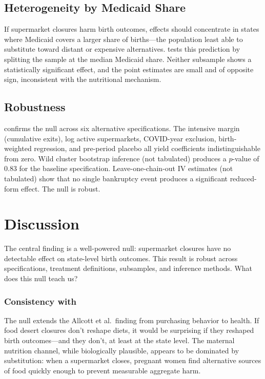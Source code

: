 \documentclass[12pt]{article}
\begin{document}


\subsection{Heterogeneity by Medicaid Share}

If supermarket closures harm birth outcomes, effects should concentrate in states where Medicaid covers a larger share of births---the population least able to substitute toward distant or expensive alternatives.  tests this prediction by splitting the sample at the median Medicaid share. Neither subsample shows a statistically significant effect, and the point estimates are small and of opposite sign, inconsistent with the nutritional mechanism.



\subsection{Robustness}

 confirms the null across six alternative specifications. The intensive margin (cumulative exits), log active supermarkets, COVID-year exclusion, birth-weighted regression, and pre-period placebo all yield coefficients indistinguishable from zero. Wild cluster bootstrap inference (not tabulated) produces a $p$-value of 0.83 for the baseline specification. Leave-one-chain-out IV estimates (not tabulated) show that no single bankruptcy event produces a significant reduced-form effect. The null is robust.



\section{Discussion}
\label{sec:discussion}

The central finding is a well-powered null: supermarket closures have no detectable effect on state-level birth outcomes. This result is robust across specifications, treatment definitions, subsamples, and inference methods. What does this null teach us?

\subsubsection*{Consistency with \citet{allcott2019food}} The null extends the Allcott et al.\ finding from purchasing behavior to health. If food desert closures don't reshape diets, it would be surprising if they reshaped birth outcomes---and they don't, at least at the state level. The maternal nutrition channel, while biologically plausible, appears to be dominated by substitution: when a supermarket closes, pregnant women find alternative sources of food quickly enough to prevent measurable aggregate harm.
\end{document}

